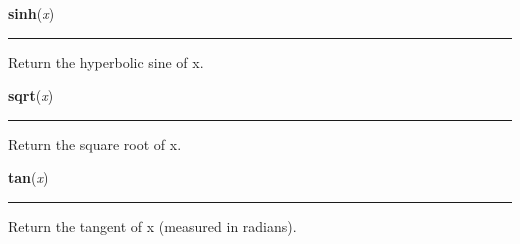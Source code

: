     \vspace{0.5ex}

\hspace{.8\funcindent}\begin{boxedminipage}{\funcwidth}

    \raggedright \textbf{sinh}(\textit{x})

    \vspace{-1.5ex}

    \rule{\textwidth}{0.5\fboxrule}
\setlength{\parskip}{2ex}
    Return the hyperbolic sine of x.

\setlength{\parskip}{1ex}
    \end{boxedminipage}

    \label{math:sqrt}

    \vspace{0.5ex}

\hspace{.8\funcindent}\begin{boxedminipage}{\funcwidth}

    \raggedright \textbf{sqrt}(\textit{x})

    \vspace{-1.5ex}

    \rule{\textwidth}{0.5\fboxrule}
\setlength{\parskip}{2ex}
    Return the square root of x.

\setlength{\parskip}{1ex}
    \end{boxedminipage}

    \label{math:tan}

    \vspace{0.5ex}

\hspace{.8\funcindent}\begin{boxedminipage}{\funcwidth}

    \raggedright \textbf{tan}(\textit{x})

    \vspace{-1.5ex}

    \rule{\textwidth}{0.5\fboxrule}
\setlength{\parskip}{2ex}
    Return the tangent of x (measured in radians).

\setlength{\parskip}{1ex}
    \end{boxedminipage}

    \label{math:tanh}

    \vspace{0.5ex}

